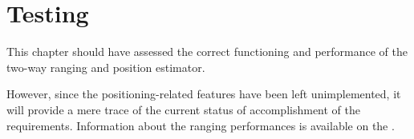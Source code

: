 \chapter{Testing}\label{ch:test}
This chapter should have assessed the correct functioning and performance of the two-way ranging and position estimator.

However, since the positioning-related features have been left unimplemented, it will provide a mere trace of the current status of accomplishment of the requirements.
Information about the ranging performances is available on the .


